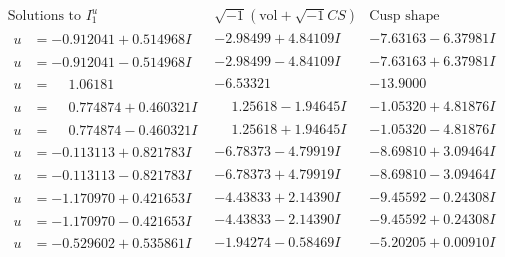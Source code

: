 \documentclass[1p]{elsarticle_modified}
\theoremstyle{definition}
\newcommand{\I}{\sqrt{-1}}
\begin{document}
$$\begin{array}{c|c|c}  
\text{Solutions to }I^u_{1}& \I (\text{vol} + \sqrt{-1}CS) & \text{Cusp shape}\\
 \hline 
\begin{aligned}
u &= -0.912041 + 0.514968 I\end{aligned}
 & -2.98499 + 4.84109 I & -7.63163 - 6.37981 I \\ \hline\begin{aligned}
u &= -0.912041 - 0.514968 I\end{aligned}
 & -2.98499 - 4.84109 I & -7.63163 + 6.37981 I \\ \hline\begin{aligned}
u &= \phantom{-}1.06181\phantom{ +0.000000I}\end{aligned}
 & -6.53321\phantom{ +0.000000I} & -13.9000\phantom{ +0.000000I} \\ \hline\begin{aligned}
u &= \phantom{-}0.774874 + 0.460321 I\end{aligned}
 & \phantom{-}1.25618 - 1.94645 I & -1.05320 + 4.81876 I \\ \hline\begin{aligned}
u &= \phantom{-}0.774874 - 0.460321 I\end{aligned}
 & \phantom{-}1.25618 + 1.94645 I & -1.05320 - 4.81876 I \\ \hline\begin{aligned}
u &= -0.113113 + 0.821783 I\end{aligned}
 & -6.78373 - 4.79919 I & -8.69810 + 3.09464 I \\ \hline\begin{aligned}
u &= -0.113113 - 0.821783 I\end{aligned}
 & -6.78373 + 4.79919 I & -8.69810 - 3.09464 I \\ \hline\begin{aligned}
u &= -1.170970 + 0.421653 I\end{aligned}
 & -4.43833 + 2.14390 I & -9.45592 - 0.24308 I \\ \hline\begin{aligned}
u &= -1.170970 - 0.421653 I\end{aligned}
 & -4.43833 - 2.14390 I & -9.45592 + 0.24308 I \\ \hline\begin{aligned}
u &= -0.529602 + 0.535861 I\end{aligned}
 & -1.94274 - 0.58469 I & -5.20205 + 0.00910 I \\ \hline\begin{aligned}

\end{aligned}
\end{array}$$
\end{document}
